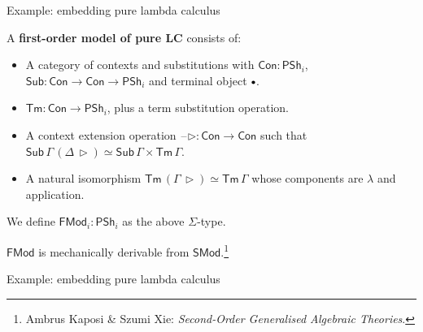 \documentclass[dvipsnames,aspectratio=169]{beamer}
\newcommand{\Con}{\mathsf{Con}}
\newcommand{\Sub}{\mathsf{Sub}}
\newcommand{\Tm}{\mathsf{Tm}}
\newcommand{\blank}{\mathord{\hspace{1pt}\text{--}\hspace{1pt}}}
\newcommand{\Set}{\mathsf{Set}}
\newcommand{\Base}{\mathsf{Base}}
\newcommand{\In}{\mathsf{In}}
\newcommand{\PSh}{\mathsf{PSh}}
\newcommand{\Cat}{\mathsf{Cat}}
\newcommand{\base}{\mathsf{base}}
\newcommand{\SMod}{\mathsf{SMod}}
\newcommand{\FMod}{\mathsf{FMod}}
\newcommand{\ext}{\triangleright}
\newcommand{\emptycon}{\scaleobj{.75}\bullet}
\begin{document}
\begin{frame}{Example: embedding pure lambda calculus}

A \textbf{first-order model of pure LC} consists of:
\begin{itemize}
\item A category of contexts and substitutions with $\Con : \PSh_i$, $\Sub : \Con \to \Con \to \PSh_i$ and terminal
      object $\emptycon$.
\item $\Tm : \Con \to \PSh_i$, plus a term substitution operation.
\item A context extension operation $\blank\ext : \Con \to \Con$ such that $\Sub\,\Gamma\,(\Delta\,\ext) \simeq \Sub\,\Gamma \times \Tm\,\Gamma$.
\item A natural isomorphism $\Tm\,(\Gamma\,\ext) \simeq \Tm\,\Gamma$ whose components are $\lambda$ and application.
\end{itemize}
\vspace{1em}
We define $\FMod_i : \PSh_i$ as the above $\Sigma$-type.

\vspace{1em}
$\FMod$ is mechanically derivable from $\SMod$.\footnote{Ambrus Kaposi \& Szumi Xie: \emph{Second-Order Generalised Algebraic Theories}.}

\end{frame}

\begin{frame}{Example: embedding pure lambda calculus}

\end{frame}






\end{document}
